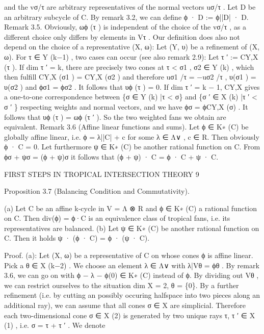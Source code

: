 \documentclass[
  11pt,
]{article}
\newenvironment{Shaded}{}{}
\newcommand{\NormalTok}[1]{#1}
\begin{document}
\begin{Shaded}
\begin{Highlighting}[]
\NormalTok{and the vσ/τ are arbitrary representatives of the normal vectors uσ/τ .}
\NormalTok{Let D be an arbitrary subcycle of C. By remark 3.2, we can define ϕ · D := ϕ||D| · D.}
\NormalTok{Remark 3.5. Obviously, ωϕ (τ ) is independent of the choice of the vσ/τ , as a different}
\NormalTok{choice only differs by elements in Vτ .}
\NormalTok{Our definition does also not depend on the choice of a representative (X, ω): Let (Y, υ)}
\NormalTok{be a refinement of (X, ω). For τ ∈ Y (k−1) , two cases can occur (see also remark 2.9):}
\NormalTok{Let τ ′ := CY,X (τ ). If dim τ ′ = k, there are precisely two cones at τ \textless{} σ1 , σ2 ∈ Y (k) ,}
\NormalTok{which then fulfill CY,X (σ1 ) = CY,X (σ2 ) and therefore uσ1 /τ = −uσ2 /τ , υ(σ1 ) = υ(σ2 )}
\NormalTok{and ϕσ1 = ϕσ2 . It follows that υϕ (τ ) = 0. If dim τ ′ = k − 1, CY,X gives a one{-}to{-}one}
\NormalTok{correspondence between \{σ ∈ Y (k) |τ \textless{} σ\} and \{σ ′ ∈ X (k) |τ ′ \textless{} σ ′ \} respecting weights}
\NormalTok{and normal vectors, and we have ϕσ = ϕCY,X (σ) . It follows that υϕ (τ ) = ωϕ (τ ′ ). So the}
\NormalTok{two weighted fans we obtain are equivalent.}
\NormalTok{Remark 3.6 (Affine linear functions and sums). Let ϕ ∈ K∗ (C) be globally affine linear,}
\NormalTok{i.e. ϕ = λ||C| + c for some λ ∈ Λ∨ , c ∈ R. Then obviously ϕ · C = 0.}
\NormalTok{Let furthermore ψ ∈ K∗ (C) be another rational function on C. From ϕσ + ψσ = (ϕ + ψ)σ}
\NormalTok{it follows that (ϕ + ψ) · C = ϕ · C + ψ · C.}

\NormalTok{                        FIRST STEPS IN TROPICAL INTERSECTION THEORY                          9}


\NormalTok{Proposition 3.7 (Balancing Condition and Commutativity).}

\NormalTok{   (a) Let C be an affine k{-}cycle in V = Λ ⊗ R and ϕ ∈ K∗ (C) a rational function on C.}
\NormalTok{       Then div(ϕ) = ϕ·C is an equivalence class of tropical fans, i.e. its representatives}
\NormalTok{       are balanced.}
\NormalTok{   (b) Let ψ ∈ K∗ (C) be another rational function on C. Then it holds ψ · (ϕ · C) =}
\NormalTok{       ϕ · (ψ · C).}


\NormalTok{Proof. (a): Let (X, ω) be a representative of C on whose cones ϕ is affine linear. Pick a}
\NormalTok{θ ∈ X (k−2) . We choose an element λ ∈ Λ∨ with λ|Vθ = ϕθ . By remark 3.6, we can go}
\NormalTok{on with ϕ − λ − ϕ(0) ∈ K∗ (C) instead of ϕ. By dividing out Vθ , we can restrict ourselves}
\NormalTok{to the situation dim X = 2, θ = \{0\}.}
\NormalTok{By a further refinement (i.e. by cutting an possibly occuring halfspace into two pieces}
\NormalTok{along an additional ray), we can assume that all cones σ ∈ X are simplicial. Therefore}
\NormalTok{each two{-}dimensional cone σ ∈ X (2) is generated by two unique rays τ, τ ′ ∈ X (1) , i.e.}
\NormalTok{σ = τ + τ ′ . We denote}


\end{Highlighting}
\end{Shaded}
\end{document}

